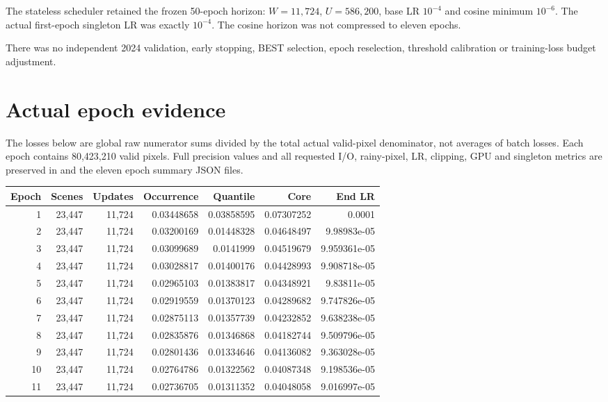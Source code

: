 \documentclass[10pt,a4paper]{article}
\begin{document}
The stateless scheduler retained the frozen 50-epoch horizon:
$W=11{,}724$, $U=586{,}200$, base LR $10^{-4}$ and cosine minimum $10^{-6}$.
The actual first-epoch singleton LR was exactly $10^{-4}$. The cosine horizon
was not compressed to eleven epochs.

There was no independent 2024 validation, early stopping, BEST selection,
epoch reselection, threshold calibration or training-loss budget adjustment.

\newpage
\section*{Actual epoch evidence}
The losses below are global raw numerator sums divided by the total actual
valid-pixel denominator, not averages of batch losses. Each epoch contains
80,423,210 valid pixels. Full precision values and all requested I/O, rainy-pixel,
LR, clipping, GPU and singleton metrics are preserved in
 and the eleven epoch summary JSON files.

{\small\setlength{\tabcolsep}{4pt}
\begin{longtable}{rrrrrrr}
Epoch & Scenes & Updates & Occurrence & Quantile & Core & End LR\\\hline
1 & 23,447 & 11,724 & 0.03448658 & 0.03858595 & 0.07307252 & 0.0001 \\
2 & 23,447 & 11,724 & 0.03200169 & 0.01448328 & 0.04648497 & 9.98983e-05 \\
3 & 23,447 & 11,724 & 0.03099689 & 0.0141999 & 0.04519679 & 9.959361e-05 \\
4 & 23,447 & 11,724 & 0.03028817 & 0.01400176 & 0.04428993 & 9.908718e-05 \\
5 & 23,447 & 11,724 & 0.02965103 & 0.01383817 & 0.04348921 & 9.83811e-05 \\
6 & 23,447 & 11,724 & 0.02919559 & 0.01370123 & 0.04289682 & 9.747826e-05 \\
7 & 23,447 & 11,724 & 0.02875113 & 0.01357739 & 0.04232852 & 9.638238e-05 \\
8 & 23,447 & 11,724 & 0.02835876 & 0.01346868 & 0.04182744 & 9.509796e-05 \\
9 & 23,447 & 11,724 & 0.02801436 & 0.01334646 & 0.04136082 & 9.363028e-05 \\
10 & 23,447 & 11,724 & 0.02764786 & 0.01322562 & 0.04087348 & 9.198536e-05 \\
11 & 23,447 & 11,724 & 0.02736705 & 0.01311352 & 0.04048058 & 9.016997e-05 \\
\end{longtable}}
\end{document}
